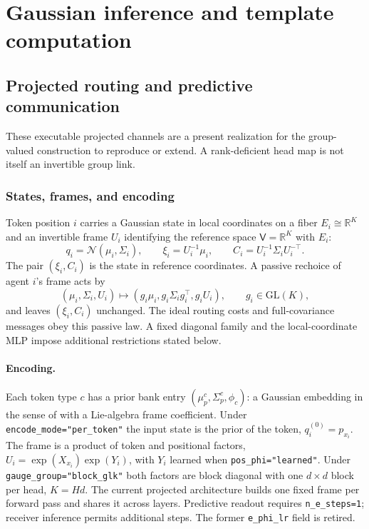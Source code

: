 \documentclass[11pt]{article}
\theoremstyle{definition}
\theoremstyle{remark}
\providecommand{\cfg}[1]{{\small\texttt{#1}}}
\providecommand{\N}{\mathcal{N}}
\begin{document}
\section{Gaussian inference and template computation}\label{unified:inference}
\subsection{Projected routing and predictive communication}
\label{inference:p}
These executable projected channels are a present realization for the group-valued construction to reproduce or extend. A rank-deficient head map is not itself an invertible group link.
\subsubsection{States, frames, and encoding}
\label{inference:p:sec:states}

Token position $i$ carries a Gaussian state in local coordinates on a fiber $E_i\cong\mathbb R^K$ and an invertible frame $U_i$ identifying the reference space $\mathsf V=\mathbb R^K$ with $E_i$:
\begin{equation}
q_i=\N(\mu_i,\Sigma_i),\qquad
\xi_i=U_i^{-1}\mu_i,\qquad
C_i=U_i^{-1}\Sigma_iU_i^{-\top}.
\label{inference:p:eq:reference_moments}
\end{equation}
The pair $(\xi_i,C_i)$ is the state in reference coordinates. A passive rechoice of agent $i$'s frame acts by
\begin{equation}
(\mu_i,\Sigma_i,U_i)\mapsto(g_i\mu_i,g_i\Sigma_ig_i^{\top},g_iU_i),\qquad g_i\in\mathrm{GL}(K),
\label{inference:p:eq:passive}
\end{equation}
and leaves $(\xi_i,C_i)$ unchanged. The ideal routing costs and full-covariance messages obey this passive law. A fixed diagonal family and the local-coordinate MLP impose additional restrictions stated below.

\paragraph{Encoding.}
Each token type $c$ has a prior bank entry $(\mu_p^c,\Sigma_p^c,\phi_c)$: a Gaussian embedding in the sense of \citep{inference:vilnis2015} with a Lie-algebra frame coefficient. Under \cfg{encode\_mode="per\_token"} the input state is the prior of the token, $q_i^{(0)}=p_{x_i}$. The frame is a product of token and positional factors, $U_i=\exp(X_{x_i})\exp(Y_i)$, with $Y_i$ learned when \cfg{pos\_phi="learned"}. Under \cfg{gauge\_group="block\_glk"} both factors are block diagonal with one $d\times d$ block per head, $K=Hd$. The current projected architecture builds one fixed frame per forward pass and shares it across layers. Predictive readout requires \cfg{n\_e\_steps=1}; receiver inference permits additional steps. The former \cfg{e\_phi\_lr} field is retired.
\end{document}

